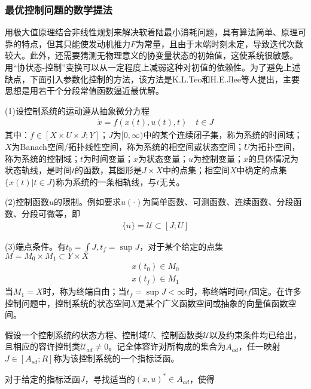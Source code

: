         \subsubsection{最优控制问题的数学提法}
            \par
            用极大值原理结合非线性规划来解决软着陆最小消耗问题，具有算法简单、原理可靠的特点，但其只能使发动机推力$F$为常量，且由于末端时刻未定，导致迭代次数较大。此外，还需要猜测无物理意义的协变量状态的初始值，这使系统很敏感。用“协状态-控制”变换可以从一定程度上减弱这种对初值的依赖性。为了避免上述缺点，下面引入参数化控制的方法，该方法是K.L.Teo和H.E.Jlee等人提出，主要思想是用若干个分段常值函数逼近最优解。
            \par
            (1)设控制系统的运动遵从抽象微分方程
            \begin{align*}
            \dot{x} = f(x(t),u(t),t) \quad t\in J
            \end{align*}
            其中：$f\in[X\times U\times J;Y]$；$J$为$[0,\infty)$中的某个连续闭子集，称为系统的时间域；$X$为Banach空间/拓扑线性空间，称为系统的相空间或状态空间；$U$为拓扑空间，称为系统的控制域；$t$为时间变量；$x$为状态变量；$u$为控制变量；$x$的具体情况为状态轨线，是时间$t$的函数，其图形是$J\times X$中的点集；相空间$X$中确定的点集$\{x(t)|t\in J\}$称为系统的一条相轨线，与$t$无关。
            \par
            (2)控制函数$u$的限制。例如要求$u(\cdot)$为简单函数、可测函数、连续函数、分段函数、分段可微等，即
            \begin{align*}
            \{u\} = \mathcal{U}\subset [J;U]
            \end{align*}
            \par
            (3)端点条件。有$t_0 = \int J,t_f = \sup J$，对于某个给定的点集$M=  M_0\times M_1 \subset Y\times X$
            \begin{align*}
            x(t_0) \in M_0\\
            x(t_f)\in M_1
            \end{align*}
            当$M_1=X$时，称为终端自由；当$t_f=\sup J<\infty$时，称终端时间$tf$固定。在许多控制问题中，控制系统的状态空间$X$是某个广义函数空间或抽象的向量值函数空间。
            \par
            假设一个控制系统的状态方程、控制域$U$、控制函数类$\mathcal{U}$以及约束条件均已给出，且相应的容许控制类$\mathcal{U}_{ad} \neq 0$。记全体容许对所构成的集合为$A_{ad}$，任一映射$J\in [A_{sd};R]$称为该控制系统的一个指标泛函。
            \par
            对于给定的指标泛函$J$，寻找适当的$(x,u)^*\in A_{ad}$，使得
